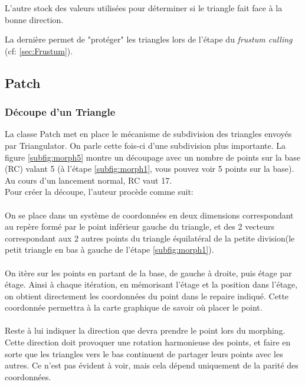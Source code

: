 	L'autre stock des valeurs utilisées pour déterminer si le triangle fait face à la bonne direction. 
	
	La dernière permet de "protéger" les triangles lors de l'étape du \emph{frustum culling} (cf: \ref{sec:Frustum}).  
	
	
	\subsection{Patch}
	\subsubsection{Découpe d'un Triangle}
	La classe Patch met en place le mécanisme de subdivision des triangles envoyés par Triangulator. On parle cette fois-ci d'une subdivision plus importante. La figure \ref{subfig:morph5} montre un découpage avec un nombre de points sur la base (RC) valant 5 (à l'étape \ref{subfig:morph1}, vous pouvez voir 5 points sur la base). Au cours d'un lancement normal, RC vaut 17.\\
	Pour créer la découpe, l'auteur procède comme suit:
	\paragraph{}
	On se place dans un système de coordonnées en deux dimensions correspondant au repère formé par le point inférieur gauche du triangle, et des 2 vecteurs correspondant aux 2 autres points du triangle équilatéral de la petite division(le petit triangle en bas à gauche de l'étape \ref{subfig:morph1}).
	\paragraph{}
	On itère sur les points en partant de la base, de gauche à droite, puis étage par étage. Ainsi à chaque itération, en mémorisant l'étage et la position dans l'étage, on obtient directement les coordonnées du point dans le repaire indiqué. Cette coordonnée permettra à la carte graphique de savoir où placer le point.
	\paragraph{}
	Reste à lui indiquer la direction que devra prendre le point lors du morphing. 
	Cette direction doit provoquer une rotation harmonieuse des points, et faire en sorte que les triangles vers le bas continuent de partager leurs points avec les autres. Ce n'est pas évident à voir, mais cela dépend uniquement de la parité des coordonnées. 
